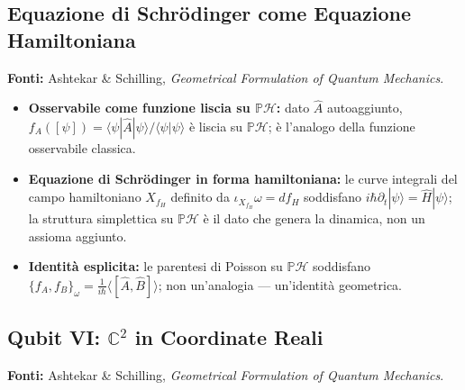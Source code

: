 \documentclass[12pt, a4paper]{article}
\newcommand{\fonti}[1]{%
	\begin{fontebox}
		\textcolor{fontecolor}{\footnotesize\textbf{Fonti:} #1}
	\end{fontebox}%
}
\begin{document}
	\subsection{Equazione di Schrödinger come Equazione Hamiltoniana}
	
	\fonti{Ashtekar \& Schilling, \textit{Geometrical Formulation of Quantum Mechanics}.}
	
	\begin{itemize}
		\item \textbf{Osservabile come funzione liscia su $\mathbb{P}\mathcal{H}$:}
		dato $\hat{A}$ autoaggiunto, $f_A([\psi]) = \langle\psi|\hat{A}|\psi\rangle /
		\langle\psi|\psi\rangle$ è liscia su $\mathbb{P}\mathcal{H}$; è l'analogo della
		funzione osservabile classica.
		\item \textbf{Equazione di Schrödinger in forma hamiltoniana:} le curve integrali
		del campo hamiltoniano $X_{f_H}$ definito da $\iota_{X_{f_H}}\omega = df_H$
		soddisfano $i\hbar\partial_t|\psi\rangle = \hat{H}|\psi\rangle$; la struttura
		simplettica su $\mathbb{P}\mathcal{H}$ è il dato che genera la dinamica,
		non un assioma aggiunto.
		\item \textbf{Identità esplicita:} le parentesi di Poisson su $\mathbb{P}\mathcal{H}$
		soddisfano $\{f_A, f_B\}_\omega = \frac{1}{i\hbar}\langle[\hat{A},\hat{B}]\rangle$;
		non un'analogia --- un'identità geometrica.
	\end{itemize}
	
	\subsection{Qubit VI: $\mathbb{C}^2$ in Coordinate Reali}
	\label{sec:qubit6}
	
	\fonti{Ashtekar \& Schilling, \textit{Geometrical Formulation of Quantum Mechanics}.}
	
\end{document}
